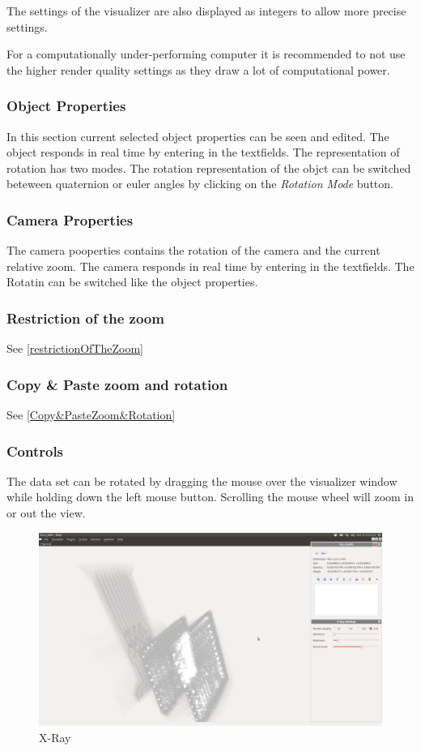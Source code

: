 The settings of the visualizer are also displayed as integers to allow more precise settings.

For a computationally under-performing computer it is recommended to not use the
higher render quality settings as they draw a lot of computational power.

\subsubsection{Object Properties}

In this section current selected object properties can be seen and edited. The object responds in real time by entering in the textfields. The representation of rotation has two modes. The rotation representation of the objct can be switched beteween quaternion or euler angles by clicking on the \textit{Rotation Mode} button.

\subsubsection{Camera Properties}

The camera pooperties contains the rotation of the camera and the current relative zoom. The camera responds in real time by entering in the textfields. The Rotatin can be switched like the object properties.

\subsubsection{Restriction of the zoom}

See \ref{restrictionOfTheZoom}

\subsubsection{Copy \& Paste zoom and rotation}

See \ref{Copy&PasteZoom&Rotation}

\subsubsection{Controls}
The data set can be rotated by dragging the mouse over the visualizer window while
holding down the left mouse button.
Scrolling the mouse wheel will zoom in or out the view.

\begin{figure}[h!]
  \centering
  \includegraphics[width=1.0\textwidth]{img/x-ray.png}
  \caption{X-Ray}
\end{figure}
